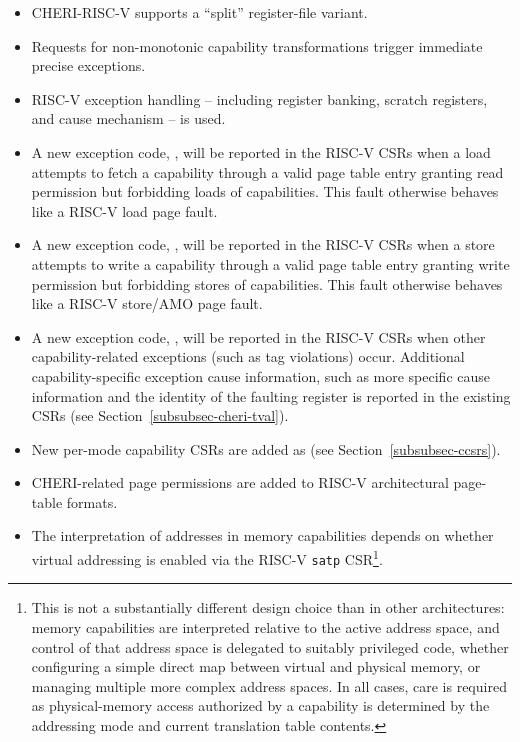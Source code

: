 \begin{itemize}
\item CHERI-RISC-V supports a ``split'' register-file variant.
\item Requests for non-monotonic capability transformations trigger
  immediate precise exceptions.
\item RISC-V exception handling -- including register banking, scratch
  registers, and cause mechanism -- is used.
\item A new exception code, \riscvloadcappagefault{}, will be
  reported in the RISC-V \xcause{} CSRs when a load attempts to fetch a
  capability through a valid page table entry granting read permission but
  forbidding loads of capabilities.  This fault otherwise behaves like a RISC-V
  load page fault.
\item A new exception code, \riscvstorecappagefault{}, will be
  reported in the RISC-V \xcause{} CSRs when a store attempts to write a
  capability through a valid page table entry granting write permission but
  forbidding stores of capabilities.  This fault otherwise behaves like a
  RISC-V store/AMO page fault.
\item A new exception code, \riscvcheriexception{}, will be
  reported in the RISC-V \xcause{} CSRs when other
  capability-related exceptions (such as tag violations) occur.
  Additional capability-specific exception cause information, such
  as more specific cause information and the identity of the faulting
  register is reported in the existing \xtval{} CSRs (see
  Section~\ref{subsubsec-cheri-tval}).
\item New per-mode capability CSRs are added as \xccsr{} (see
  Section~\ref{subsubsec-ccsrs}).
\item CHERI-related page permissions are added to RISC-V architectural
  page-table formats.
\item The interpretation of addresses in memory capabilities
  depends on whether virtual addressing is enabled via the RISC-V
  \texttt{satp} CSR\footnote{This is not a substantially different design
  choice than in other architectures: memory
  capabilities are interpreted relative to the active address space, and
  control of that address space is delegated to suitably privileged code,
  whether configuring a simple direct map between virtual and physical memory,
  or managing multiple more complex address spaces.
  In all cases, care is required as physical-memory access authorized by a
  capability is determined by the addressing mode and current translation
  table contents.}.

\end{itemize}
